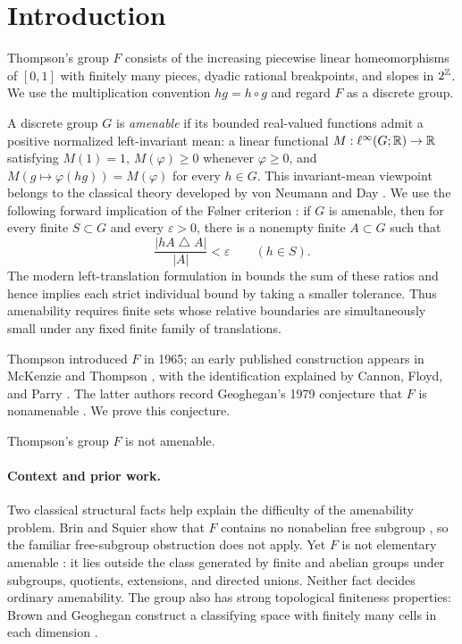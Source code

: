\section{Introduction}
\label{sec:introduction}

Thompson's group \(F\) consists of the increasing piecewise linear
homeomorphisms of \([0,1]\) with finitely many pieces, dyadic rational
breakpoints, and slopes in \(2^{\mathbb Z}\). We use the multiplication convention
\(hg=h\circ g\) and regard \(F\) as a discrete group.

A discrete group \(G\) is \emph{amenable} if its bounded real-valued
functions admit a positive normalized left-invariant mean: a linear
functional \(M:\ell^\infty(G;\mathbb R)\to\mathbb R\) satisfying \(M(1)=1\),
\(M(\varphi)\ge0\) whenever \(\varphi\ge0\), and
\(M(g\mapsto\varphi(hg))=M(\varphi)\) for every \(h\in G\).
This invariant-mean viewpoint belongs to the classical theory developed
by von Neumann and Day \cite{vonNeumann1929,Day1957}.
We use the following forward implication of the F\o lner criterion
\cite{Folner1955}: if \(G\) is amenable, then for every finite
\(S\subset G\) and every \(\varepsilon>0\), there is a nonempty finite
\(A\subset G\) such that
\begin{equation}\label{eq:folner}
  \frac{|hA\mathbin{\triangle}A|}{|A|}<\varepsilon
  \qquad(h\in S).
\end{equation}
The modern left-translation formulation in
\cite[Theorem~1.2]{Moore2013} bounds the sum of these ratios and hence
implies each strict individual bound by taking a smaller tolerance.
Thus amenability requires finite sets
whose relative boundaries are simultaneously small under any fixed
finite family of translations.

Thompson introduced \(F\) in 1965; an early published construction appears
in McKenzie and Thompson \cite{McKenzieThompson1973}, with the identification
explained by Cannon, Floyd, and Parry \cite[pp.~215--216]{CannonFloydParry1996}.
The latter authors record Geoghegan's 1979 conjecture that \(F\) is
nonamenable \cite[p.~227]{CannonFloydParry1996}. We prove this conjecture.

\begin{theorem}\label{thm:main}
Thompson's group \(F\) is not amenable.
\end{theorem}

\paragraph{Context and prior work.}
Two classical structural facts help explain the difficulty of the
amenability problem. Brin and Squier show that \(F\) contains no
nonabelian free subgroup \cite[Theorem~3.1]{BrinSquier1985}, so the familiar
free-subgroup obstruction does not apply. Yet \(F\) is not elementary
amenable \cite[Theorem~4.10]{CannonFloydParry1996}: it lies outside the class
generated by finite and abelian groups under subgroups, quotients,
extensions, and directed unions. Neither fact decides ordinary
amenability. The group also has strong topological finiteness properties:
Brown and Geoghegan construct a classifying space with finitely many
cells in each dimension \cite{BrownGeoghegan1984}.

